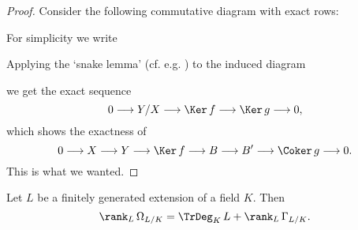 \documentclass[../main]{subfiles}
\begin{document}
\begin{proof}
Consider the following commutative diagram with exact rows:

\begin{center}
\end{center}

For simplicity we write

\begin{center}
\end{center}

Applying the `snake lemma' (cf. e.g. \cite[Ch. 1]{bourbaki1998commutative}) to the induced diagram

\begin{center}
\end{center}

we get the exact sequence \[0 \longrightarrow Y/X \longrightarrow \Ker \, f \longrightarrow \Ker \, g \longrightarrow 0,\] which shows the exactness of \[0 \longrightarrow X \longrightarrow Y \longrightarrow \Ker \, f \longrightarrow B \longrightarrow B' \longrightarrow \Coker \, g \longrightarrow 0.\] This is what we wanted.
\end{proof}

\begin{partheorem}
\label{thm:092} 
Let $L$ be a finitely generated extension of a field $K$. Then
\[
\rank_L \, \Omega_{L/K} = \TrDeg_K \, L + \rank_L \, \Gamma_{L/K}.
\]
\end{partheorem}
\end{document}
